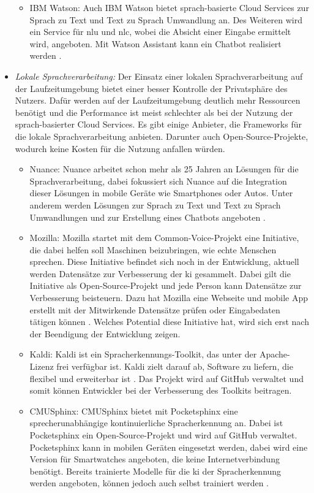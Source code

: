 \begin{itemize}
\begin{itemize}
		\item IBM Watson: Auch IBM Watson bietet sprach-basierte Cloud Services zur Sprach zu Text und Text zu Sprach Umwandlung an. Des Weiteren wird ein Service für \ac{nlu} und \ac{nlc}, wobei die Absicht einer Eingabe ermittelt wird, angeboten. Mit Watson Assistant kann ein Chatbot realisiert werden \cite{IBMWatsonSpeechServices}.
	\end{itemize}
	\item \textsl{Lokale Sprachverarbeitung:} Der Einsatz einer lokalen Sprachverarbeitung auf der Laufzeitumgebung bietet einer besser Kontrolle der Privatsphäre des Nutzers. Dafür werden auf der Laufzeitumgebung deutlich mehr Ressourcen benötigt und die Performance ist meist schlechter als bei der Nutzung der sprach-basierter Cloud Services. Es gibt einige Anbieter, die Frameworks für die lokale Sprachverarbeitung anbieten. Darunter auch Open-Source-Projekte, wodurch keine Kosten für die Nutzung anfallen würden. 
	\begin{itemize}
		\item Nuance: Nuance arbeitet schon mehr als 25 Jahren an Lösungen für die Sprachverarbeitung, dabei fokussiert sich Nuance auf die Integration dieser Lösungen in mobile Geräte wie Smartphones oder Autos. Unter anderem werden Lösungen zur Sprach zu Text und Text zu Sprach Umwandlungen und zur Erstellung eines Chatbots angeboten \cite{Nuance}. 
		\item Mozilla: Mozilla startet mit dem Common-Voice-Projekt eine Initiative, die dabei helfen soll Maschinen beizubringen, wie echte Menschen sprechen. Diese Initiative befindet sich noch in der Entwicklung, aktuell werden Datensätze zur Verbesserung der \ac{ki} gesammelt. Dabei gilt die Initiative als Open-Source-Projekt und jede Person kann Datensätze zur Verbesserung beisteuern. Dazu hat Mozilla eine Webseite und mobile App erstellt mit der Mitwirkende Datensätze prüfen oder Eingabedaten tätigen können \cite{MozillaCommonVoice}. Welches Potential diese Initiative hat, wird sich erst nach der Beendigung der Entwicklung zeigen.
		\item Kaldi: Kaldi ist ein Spracherkennungs-Toolkit, das unter der Apache-Lizenz frei verfügbar ist. Kaldi zielt darauf ab, Software zu liefern, die flexibel und erweiterbar ist \cite{Kaldi}. Das Projekt wird auf GitHub verwaltet und somit können Entwickler bei der Verbesserung des Toolkits beitragen.
		\item CMUSphinx: CMUSphinx bietet mit Pocketsphinx eine sprecherunabhängige kontinuierliche Spracherkennung an. Dabei ist Pocketsphinx ein Open-Source-Projekt und wird auf GitHub verwaltet. Pocketsphinx kann in mobilen Geräten eingesetzt werden, dabei wird eine Version für Smartwatches angeboten, die keine Internetverbindung benötigt. Bereits trainierte Modelle für die \ac{ki} der Spracherkennung werden angeboten, können jedoch auch selbst trainiert werden \cite{Pocketsphinx}.
	\end{itemize}
\end{itemize}

